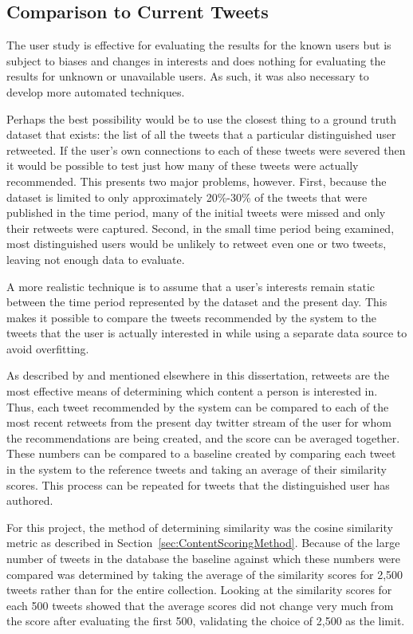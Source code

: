 \subsection{Comparison to Current Tweets}
\label{sec:ComparisonToCurrentTweets}

The user study is effective for evaluating the results for the known users but is subject to biases and changes in interests and does nothing for evaluating the results for unknown or unavailable users. As such, it was also necessary to develop more automated techniques.

Perhaps the best possibility would be to use the closest thing to a ground truth dataset that exists: the list of all the tweets that a particular distinguished user retweeted. If the user's own connections to each of these tweets were severed then it would be possible to test just how many of these tweets were actually recommended. This presents two major problems, however. First, because the dataset is limited to only approximately 20\%-30\% of the tweets that were published in the time period, many of the initial tweets were missed and only their retweets were captured. Second, in the small time period being examined, most distinguished users would be unlikely to retweet even one or two tweets, leaving not enough data to evaluate.

A more realistic technique is to assume that a user's interests remain static between the time period represented by the dataset and the present day. This makes it possible to compare the tweets recommended by the system to the tweets that the user is actually interested in while using a separate data source to avoid overfitting.

As described by \cite{Welch2011} and mentioned elsewhere in this dissertation, retweets are the most effective means of determining which content a person is interested in. Thus, each tweet recommended by the system can be compared to each of the most recent retweets from the present day twitter stream of the user for whom the recommendations are being created, and the score can be averaged together. These numbers can be compared to a baseline created by comparing each tweet in the system to the reference tweets and taking an average of their similarity scores. This process can be repeated for tweets that the distinguished user has authored.

For this project, the method of determining similarity was the cosine similarity metric as described in Section~\ref{sec:ContentScoringMethod}. Because of the large number of tweets in the database the baseline against which these numbers were compared was determined by taking the average of the similarity scores for 2,500 tweets rather than for the entire collection. Looking at the similarity scores for each 500 tweets showed that the average scores did not change very much from the score after evaluating the first 500, validating the choice of 2,500 as the limit.

